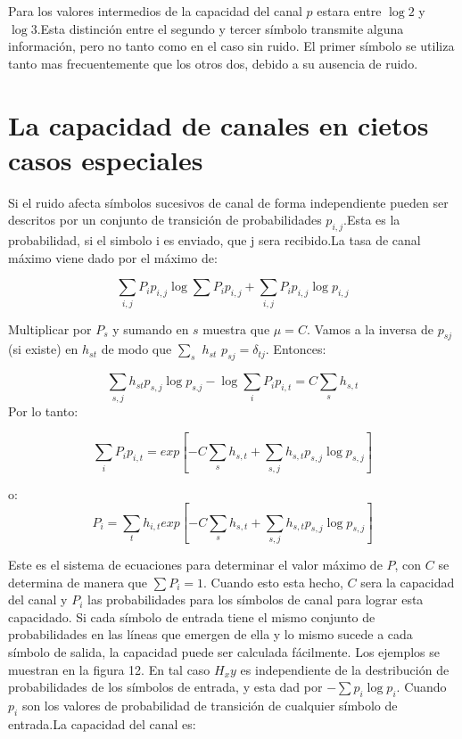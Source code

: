 Para los valores intermedios de la capacidad del canal $p$ estara entre $\log{2}$ y $\log{3}$.Esta distinci\'on 
entre el segundo y tercer s\'imbolo transmite alguna informaci\'on, pero no tanto como en el caso sin ruido.
El primer s\'imbolo se utiliza tanto mas frecuentemente que los otros dos, debido a su ausencia de ruido.

\clearpage

\section{La capacidad de canales en cietos casos especiales}

Si el ruido afecta s\'imbolos sucesivos de canal de forma
independiente pueden ser descritos por un conjunto de transici\'on de
probabilidades $p_{i,j}$.Esta es la probabilidad, si el simbolo i es
enviado, que j sera recibido.La tasa de canal m\'aximo viene dado por
el m\'aximo de:

\begin{equation}
  \sum_{i,j}P_i p_{i,j} \log{\sum{P_i p_{i,j}}} + \sum_{i,j}P_i p_{i,j}\log{p_{i,j}}
\end{equation}
 
Multiplicar por $P_s$ y sumando en $s$ muestra que $\mu = C$. Vamos a la inversa de $p_{sj}$ (si existe) en $h_{st}$  de modo que 
$\sum_{s}$ $h_{st}$ $p_{sj} = \delta_{tj}$. Entonces: 

\begin{equation}
  \sum_{s,j}h_{st} p_{s,j} \log{p_{s.j}} - \log{\sum_{i}P_i p_{i,t}} = C \sum_{s} h_{s,t}
\end{equation}
Por lo tanto:

\begin{equation}
  \sum_{i} P_i p_{i,t} = exp[- C \sum_{s} h_{s,t}+ \sum_{s,j} h_{s,t} p_{s,j} \log{p_{s,j}}]
\end{equation}

o:  
\begin{equation}
  P_i = \sum_{t} h_{i,t} exp[ - C \sum_{s} h_{s,t}+ \sum_{s,j} h_{s,t} p_{s,j} \log{p_{s,j}} ]
\end{equation}


Este es el sistema de ecuaciones para determinar el valor m\'aximo de $P$, con $C$ se determina 
de manera que $\sum P_i = 1$. Cuando esto esta hecho, $C$ sera la capacidad del canal y $P_i$ las probabilidades 
para los s\'imbolos de canal para lograr esta capacidado.
Si cada s\'imbolo de entrada tiene el mismo conjunto de probabilidades en las l\'ineas que emergen de ella 
y lo mismo sucede a cada s\'imbolo de salida, la capacidad puede ser calculada f\'acilmente. Los ejemplos se muestran en la figura 12. 
En tal caso $H_xy$ es independiente de la destribuci\'on de probabilidades de los s\'imbolos de entrada, y esta dad por $-\sum p_i \log{p_i}$. 
Cuando $p_i$ son los valores de probabilidad de transici\'on de cualquier s\'imbolo de entrada.La capacidad del canal es:


